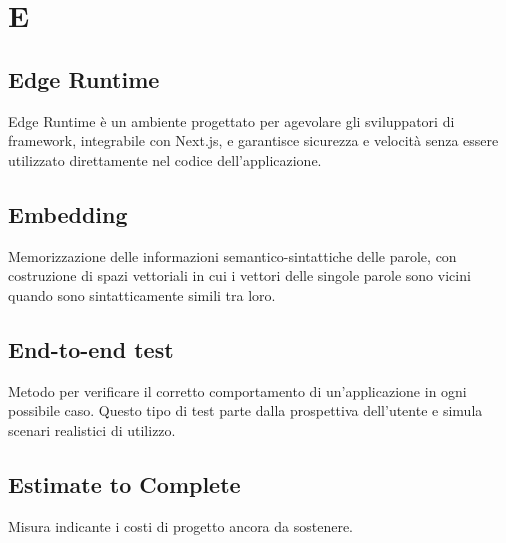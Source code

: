 \chapter{E}

\section{Edge Runtime}
Edge Runtime è un ambiente progettato per agevolare gli sviluppatori di framework, integrabile con Next.js, e garantisce sicurezza e velocità senza essere utilizzato direttamente nel codice dell'applicazione.

\section{Embedding}\label{sec:Embeddings}
Memorizzazione delle informazioni semantico-sintattiche delle parole, con costruzione di spazi vettoriali in cui i vettori delle singole parole sono vicini quando sono sintatticamente simili tra loro.

\section{End-to-end test}
Metodo per verificare il corretto comportamento di un'applicazione in ogni possibile caso. Questo tipo di test parte dalla prospettiva dell'utente e simula scenari realistici di utilizzo.

\section{Estimate to Complete}
Misura indicante i costi di progetto ancora da sostenere.
